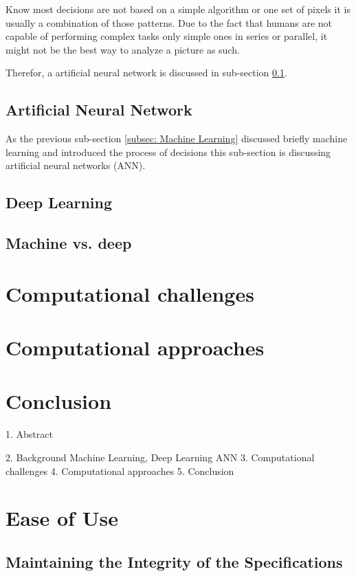 \documentclass[conference]{IEEEtran}
\begin{document}
Know most decisions are not based on a simple algorithm or one set of pixels it is usually a combination of those patterns. Due to the fact that humans are not capable of performing complex tasks only simple ones in series or parallel, it might not be the best way to analyze a picture as such. 

Therefor, a artificial neural network is discussed in sub-section \ref{subsec: Artificial Neural Network}.

\subsection{Artificial Neural Network}\label{subsec: Artificial Neural Network}
As the previous sub-section \ref{subsec: Machine Learning} discussed briefly machine learning and introduced the process of decisions this sub-section is discussing artificial neural networks (ANN).
\subsection{Deep Learning}\label{subsec: Deep Learning}


\subsection{Machine vs. deep}

\section{Computational challenges}

\section{Computational approaches}

\section{Conclusion}
1. Abstract

2. Background
Machine Learning, Deep Learning ANN
3. Computational challenges
4. Computational approaches
5. Conclusion

\section{Ease of Use}

\subsection{Maintaining the Integrity of the Specifications}
\end{document}
